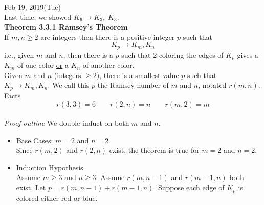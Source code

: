 \documentclass[12pt]{article}
\begin{document}
\vspace{2\baselineskip}
Feb 19, 2019(Tue)\\
Last time, we showed $K_6\rightarrow K_3,\;K_3$.\\

{\bf Theorem 3.3.1 Ramsey's Theorem} \\
If $m,n \ge 2$ are integers then there is a positive integer $p$ such that $$K_p\rightarrow K_m,K_n$$
i.e., given $m$ and $n$, then there is a $p$ such that 2-coloring the edges of $K_p$ gives a $K_m$ of one color \underline{or} a $K_n$ of another color.\\

Given $m$ and $n$ (integers $\ge 2$), there is a smallest value $p$ such that $K_p\rightarrow K_m,K_n$. We call this $p$ the Ramsey number of $m$ and $n$, notated $r(m,n)$.\\

\underline{Facts}
$$r(3,3)=6\qquad r(2,n)=n\qquad r(m,2)=m$$\\

{\sl Proof outline} We double induct on both $m$ and $n$.
\begin{itemize}
    \item[] Base Cases: $m=2$ and $n=2$\\ 
    Since $r(m,2)$ and $r(2,n)$ exist, the theorem is true for $m=2$ and $n=2$.\\
    
    \item[] Induction Hypothesis\\
    Assume $m\ge 3$ and $n\ge 3$. Assume $r(m,n-1)$ and $r(m-1,n)$ both exist. Let $p=r(m,n-1)+r(m-1,n)$. Suppose each edge of $K_p$ is colored either red or blue.
\end{itemize}
\end{document}
